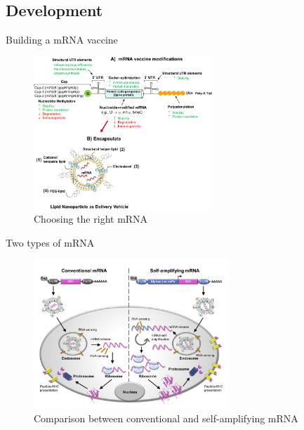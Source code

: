 \subsection{Development}

\begin{frame}{Building a mRNA vaccine}
    
    \begin{figure}
        \centering
        \includegraphics[width=0.6\textwidth]{imgs/RNA2.jpg}
        \caption{Choosing the right mRNA \autocite{granados-riveronEngineeringCurrentNucleosidemodified2021}}
        \label{fig:mRNAvac2}
    \end{figure}
    
\end{frame}

\begin{frame}{Two types of mRNA}
\begin{figure}
    \centering
    \includegraphics[width=0.65\textwidth]{imgs/mRNA_action.JPG}
    \caption{Comparison between conventional and self-amplifying mRNA \autocite{MRNATransformativeTechnology}}
    \label{fig:mRNAtypes}
\end{figure}
\end{frame}


